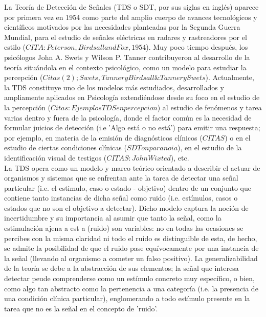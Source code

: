 La Teoría de Detección de Señales (TDS o SDT, por sus siglas en inglés) aparece por primera vez en 1954 como parte del amplio cuerpo de avances tecnológicos y científicos motivados por las necesidades planteadas por la Segunda Guerra Mundial, para el estudio de señales eléctricas en radares y rastreadores por el estilo ($CITA: Peterson, Birdsall and Fox, 1954$). Muy poco tiempo después, los psicólogos John A. Swets y Wilson P. Tanner contribuyeron al desarrollo de la teoría situándola en el contexto psicológico, como un modelo para estudiar la percepción ($Citas (2); Swets, Tanner y Birdsall  \& Tanner y Swets$). Actualmente, la TDS constituye uno de los modelos más estudiados, desarrollados y ampliamente aplicados en Psicología extendiéndose desde su foco en el estudio de la percepción ($Citas: Ejemplos TDS en percepcion$) al estudio de fenómenos y tarea varias dentro y fuera de la psicología, donde el factor común es la necesidad de formular juicios de detección (i.e 'Algo está o no está') para emitir una respuesta; por ejemplo, en materia de la emisión de diagnósticos clínicos ($CITAS$) o en el estudio de ciertas condiciones clínicas ($SDT on paranoia$), en el estudio de la identificación visual de testigos ($CITAS: John Wixted$), etc.\\ 

La TDS opera como un modelo y marco teórico orientado a describir el actuar de organismos y sistemas que se enfrentan ante la tarea de detectar una señal particular (i.e. el estimulo, caso o estado - objetivo) dentro de un conjunto que contiene tanto instancias de dicha señal como ruido (i.e. estímulos, casos o estados que no son el objetivo a detectar). Dicho modelo captura la noción de incertidumbre y su importancia al asumir que tanto la señal, como la estimulación ajena a est a (ruido) son variables: no en todas las ocasiones se percibes con la misma claridad ni todo el ruido es distinguible de esta, de hecho, se admite la posibilidad de que el ruido pase equívocamente por una instancia de la señal (llevando al organismo a cometer un falso positivo). La generalizabilidad de la teoría se debe a la abstracción de sus elementos; la señal que interesa detectar peude comprenderse como un estímulo concreto muy específico, o bien, como algo tan abstracto como la pertenencia a una categoría (i.e. la presencia de una condición clínica particular), englomerando a todo estímulo presente en la tarea que no es la señal en el concepto de 'ruido'.  \\ 

